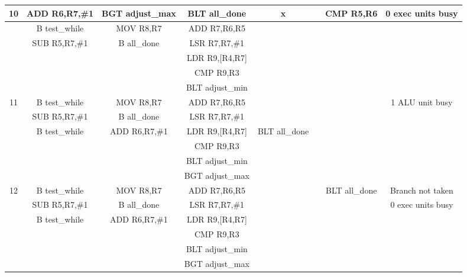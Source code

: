 \documentclass{article}
\begin{document}
{\begin{landscape}
\begin{longtable}{|c|c|c|c|c:c|c|c|}
    10 & ADD R6,R7,\#1 & BGT adjust\_max & BLT all\_done & x & & CMP R5,R6 & 0 exec units busy \\ \hline
     & B test\_while & MOV R8,R7 & ADD R7,R6,R5 & & & & \\ \hline
     & SUB R5,R7,\#1 & B all\_done & LSR R7,R7,\#1 & &  & & \\ \hline
     &  &  & LDR R9,[R4,R7] & &  & & \\ \hline
     &  &  & CMP R9,R3 &  &  &  & \\ \hline
     &  &  & BLT adjust\_min &  &  &  & \\ \hline \hline
     
    11 & B test\_while & MOV R8,R7 &ADD R7,R6,R5 & & & & 1 ALU unit busy \\ \hline
     & SUB R5,R7,\#1 & B all\_done & LSR R7,R7,\#1 & & & & \\ \hline
     & B test\_while & ADD R6,R7,\#1 & LDR R9,[R4,R7] & BLT all\_done &  & & \\ \hline
     &  &  & CMP R9,R3 & &  & & \\ \hline
     &  &  & BLT adjust\_min &  &  &  & \\ \hline
     &  &  & BGT adjust\_max &  &  &  & \\ \hline \hline
     
    12 & B test\_while & MOV R8,R7 &ADD R7,R6,R5 & & & BLT all\_done & Branch not taken \\ \hline
     & SUB R5,R7,\#1 & B all\_done & LSR R7,R7,\#1 & & & & 0 exec units busy \\ \hline
     & B test\_while & ADD R6,R7,\#1 & LDR R9,[R4,R7] & &  & & \\ \hline
     &  &  & CMP R9,R3 & &  & & \\ \hline
     &  &  & BLT adjust\_min &  &  &  & \\ \hline
     &  &  & BGT adjust\_max &  &  &  & \\ \hline \hline
     

\end{longtable}
\end{landscape}}
\end{document}
